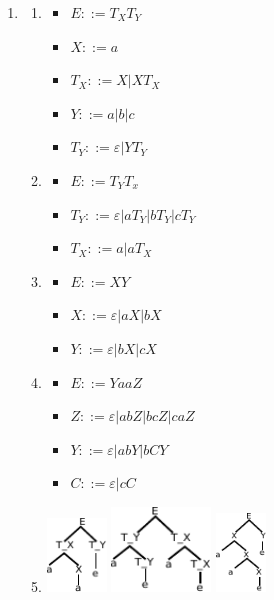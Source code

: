 \begin{enumerate}
	\item 
		\begin{enumerate}
			\item
				\begin{itemize}
					\item $E ::= T_X T_Y $
					\item $X ::= a$
					\item $T_X ::= X | XT_X$
					\item $Y ::= a | b | c$
					\item $T_Y ::= \varepsilon | YT_Y$
				\end{itemize}
			\item
				\begin{itemize}
					\item $E ::= T_YT_x$
					\item $T_Y ::= \varepsilon | aT_Y | bT_Y | cT_Y$
					\item $T_X ::= a | aT_X$
				\end{itemize}
			\item
				\begin{itemize}
					\item $E ::= XY$
					\item $X ::= \varepsilon | aX | bX$
					\item $Y ::= \varepsilon | bX | cX$
				\end{itemize}
			\item
				\begin{itemize}
					\item $E ::= YaaZ$
					\item $Z ::= \varepsilon | abZ | bcZ | caZ$
					\item $Y ::= \varepsilon | abY | bCY$
					\item $C ::= \varepsilon | cC$
				\end{itemize}
			\item \includegraphics[width=60px]{Images/fig4.pdf} \includegraphics[width=100px]{Images/fig5.pdf} \includegraphics[width=50px]{Images/fig6.pdf}

\end{enumerate}
\end{enumerate}
